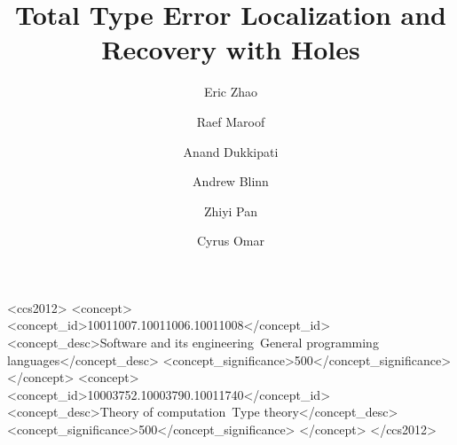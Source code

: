 \documentclass[acmsmall,screen,nonacm,prologue,dvipsnames]{acmart}
\begin{document}
\title{Total Type Error Localization and Recovery with Holes}

\author{Eric Zhao}

\author{Raef Maroof}

\author{Anand Dukkipati}

\author{Andrew Blinn}

\author{Zhiyi Pan}

\author{Cyrus Omar}



\begin{CCSXML}
<ccs2012>
   <concept>
       <concept_id>10011007.10011006.10011008</concept_id>
       <concept_desc>Software and its engineering~General programming languages</concept_desc>
       <concept_significance>500</concept_significance>
       </concept>
   <concept>
       <concept_id>10003752.10003790.10011740</concept_id>
       <concept_desc>Theory of computation~Type theory</concept_desc>
       <concept_significance>500</concept_significance>
       </concept>
 </ccs2012>
\end{CCSXML}



\maketitle









\end{document}
